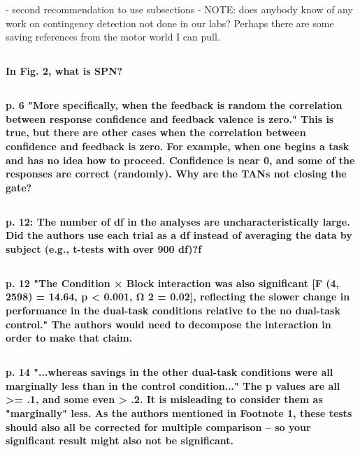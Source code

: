 \documentclass[10pt,a4paper]{article} \usepackage{amsmath} \usepackage{parskip}
\begin{document}
- second recommendation to use subsections
- NOTE: does anybody know of any work on contingency detection not done in our
labs? Perhaps there are some saving references from the motor world I can pull.

\subsection{} \textbf{
  In Fig. 2, what is SPN?
}

\subsection{} \textbf{
  p. 6 "More specifically, when the feedback is random the correlation between
  response confidence and feedback valence is zero." This is true, but there are
  other cases when the correlation between confidence and feedback is zero. For
  example, when one begins a task and has no idea how to proceed. Confidence is
  near 0, and some of the responses are correct (randomly). Why are the TANs not
  closing the gate?
}

\subsection{} \textbf{
  p. 12: The number of df in the analyses are uncharacteristically large. Did the
  authors use each trial as a df instead of averaging the data by subject (e.g.,
  t-tests with over 900 df)?f
}

\subsection{} \textbf{
  p. 12 "The Condition × Block interaction was also significant [F (4, 2598) =
  14.64, p < 0.001, Ω 2 = 0.02], reflecting the slower change in performance in
  the dual-task conditions relative to the no dual-task control." The authors
  would need to decompose the interaction in order to make that claim.
}

\subsection{} \textbf{
  p. 14 "...whereas savings in the other dual-task
  conditions were all marginally less than in the control condition..." The p
  values are all >= .1, and some even > .2. It is misleading to consider them as
  "marginally" less. As the authors mentioned in Footnote 1, these tests should
  also all be corrected for multiple comparison -- so your significant result
  might also not be significant.
}
\end{document}
